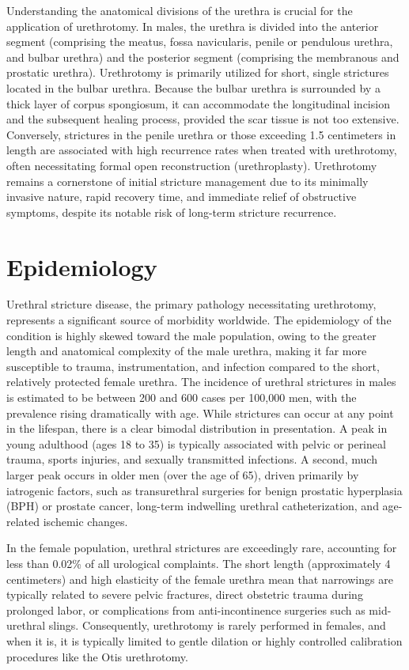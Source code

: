 Understanding the anatomical divisions of the urethra is crucial for the application of urethrotomy. In males, the urethra is divided into the anterior segment (comprising the meatus, fossa navicularis, penile or pendulous urethra, and bulbar urethra) and the posterior segment (comprising the membranous and prostatic urethra). Urethrotomy is primarily utilized for short, single strictures located in the bulbar urethra. Because the bulbar urethra is surrounded by a thick layer of corpus spongiosum, it can accommodate the longitudinal incision and the subsequent healing process, provided the scar tissue is not too extensive. Conversely, strictures in the penile urethra or those exceeding 1.5 centimeters in length are associated with high recurrence rates when treated with urethrotomy, often necessitating formal open reconstruction (urethroplasty). Urethrotomy remains a cornerstone of initial stricture management due to its minimally invasive nature, rapid recovery time, and immediate relief of obstructive symptoms, despite its notable risk of long-term stricture recurrence.

\section*{Epidemiology}
Urethral stricture disease, the primary pathology necessitating urethrotomy, represents a significant source of morbidity worldwide. The epidemiology of the condition is highly skewed toward the male population, owing to the greater length and anatomical complexity of the male urethra, making it far more susceptible to trauma, instrumentation, and infection compared to the short, relatively protected female urethra. The incidence of urethral strictures in males is estimated to be between 200 and 600 cases per 100,000 men, with the prevalence rising dramatically with age. While strictures can occur at any point in the lifespan, there is a clear bimodal distribution in presentation. A peak in young adulthood (ages 18 to 35) is typically associated with pelvic or perineal trauma, sports injuries, and sexually transmitted infections. A second, much larger peak occurs in older men (over the age of 65), driven primarily by iatrogenic factors, such as transurethral surgeries for benign prostatic hyperplasia (BPH) or prostate cancer, long-term indwelling urethral catheterization, and age-related ischemic changes.

In the female population, urethral strictures are exceedingly rare, accounting for less than 0.02\% of all urological complaints. The short length (approximately 4 centimeters) and high elasticity of the female urethra mean that narrowings are typically related to severe pelvic fractures, direct obstetric trauma during prolonged labor, or complications from anti-incontinence surgeries such as mid-urethral slings. Consequently, urethrotomy is rarely performed in females, and when it is, it is typically limited to gentle dilation or highly controlled calibration procedures like the Otis urethrotomy.

